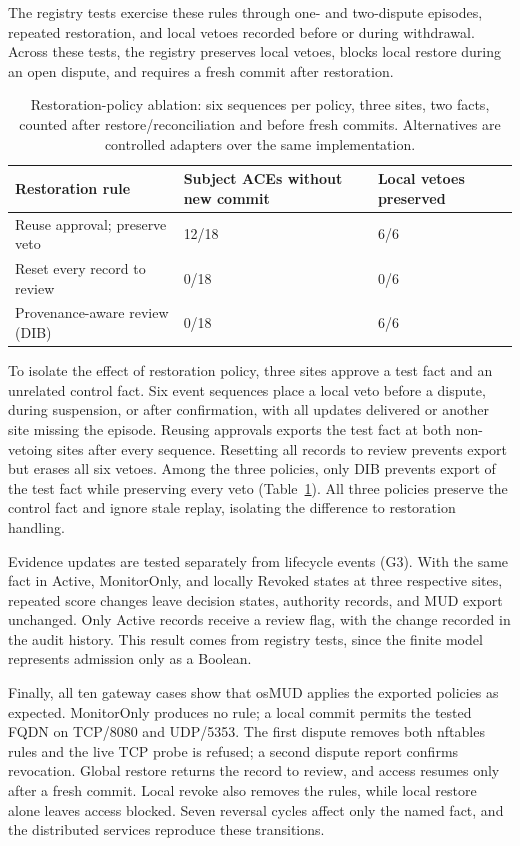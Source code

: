 \documentclass[journal]{IEEEtran}
\theoremstyle{definition}
\begin{document}
The registry tests exercise these rules through one- and two-dispute episodes, repeated restoration, and local vetoes recorded before or during withdrawal. Across these tests, the registry preserves local vetoes, blocks local restore during an open dispute, and requires a fresh commit after restoration.

\begin{table}[t]
\centering
\caption{Restoration-policy ablation: six sequences per policy, three sites, two facts, counted after restore/reconciliation and before fresh commits. Alternatives are controlled adapters over the same implementation.}
\label{tab:comparison}
\scriptsize
\begin{tabular}{@{}p{3.0cm}p{1.9cm}p{1.9cm}@{}}
\toprule
Restoration rule & Subject ACEs without new commit & Local vetoes preserved \\
\midrule
Reuse approval; preserve veto & 12/18 & 6/6 \\
Reset every record to review & 0/18 & 0/6 \\
Provenance-aware review (DIB) & 0/18 & 6/6 \\
\bottomrule
\end{tabular}
\end{table}



To isolate the effect of restoration policy, three sites approve a test fact and an unrelated control fact. Six event sequences place a local veto before a dispute, during suspension, or after confirmation, with all updates delivered or another site missing the episode. Reusing approvals exports the test fact at both non-vetoing sites after every sequence. Resetting all records to review prevents export but erases all six vetoes. Among the three policies, only DIB prevents export of the test fact while preserving every veto (Table~\ref{tab:comparison}). All three policies preserve the control fact and ignore stale replay, isolating the difference to restoration handling.

Evidence updates are tested separately from lifecycle events (G3). With the same fact in Active, MonitorOnly, and locally Revoked states at three respective sites, repeated score changes leave decision states, authority records, and MUD export unchanged. Only Active records receive a review flag, with the change recorded in the audit history. This result comes from registry tests, since the finite model represents admission only as a Boolean.

Finally, all ten gateway cases show that osMUD applies the exported policies as expected. MonitorOnly produces no rule; a local commit permits the tested FQDN on TCP/8080 and UDP/5353. The first dispute removes both nftables rules and the live TCP probe is refused; a second dispute report confirms revocation. Global restore returns the record to review, and access resumes only after a fresh commit. Local revoke also removes the rules, while local restore alone leaves access blocked. Seven reversal cycles affect only the named fact, and the distributed services reproduce these transitions.
\end{document}
